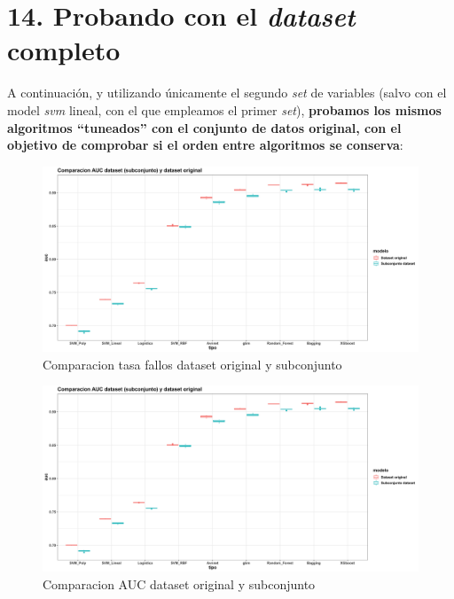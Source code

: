 \documentclass[
]{article}
\begin{document}
\hypertarget{probando-con-el-dataset-completo}{%
\section{\texorpdfstring{14. Probando con el \emph{dataset}
completo}{14. Probando con el dataset completo}}\label{probando-con-el-dataset-completo}}

A continuación, y utilizando únicamente el segundo \emph{set} de
variables (salvo con el model \emph{svm} lineal, con el que empleamos el
primer \emph{set}), \textbf{probamos los mismos algoritmos ``tuneados''
con el conjunto de datos original, con el objetivo de comprobar si el
orden entre algoritmos se conserva}:

\begin{figure}[h!]

{\centering \includegraphics[width=0.99\linewidth,height=0.99\textheight,]{./charts/comparacion_datasets_tasa_fallos} 

}

\caption{Comparacion tasa fallos dataset original y subconjunto}\label{fig:unnamed-chunk-151}
\end{figure}
\begin{figure}[h!]

{\centering \includegraphics[width=0.99\linewidth,height=0.99\textheight,]{./charts/comparacion_datasets_auc} 

}

\caption{Comparacion AUC dataset original y subconjunto}\label{fig:unnamed-chunk-152}
\end{figure}
\end{document}
